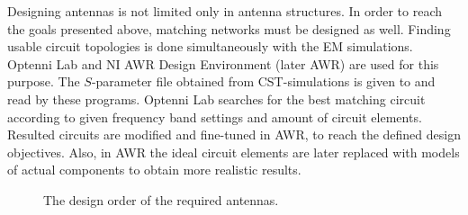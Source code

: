 Designing antennas is not limited only in antenna structures. In order to reach the goals presented above, matching networks must be designed as well. Finding usable circuit topologies is done simultaneously with the EM simulations. Optenni Lab \cite{optenni} and NI AWR Design Environment \cite{awr} (later AWR) are used for this purpose. The $S$-parameter file obtained from CST-simulations is given to and read by these programs. Optenni Lab searches for the best matching circuit according to given frequency band settings and amount of circuit elements. Resulted circuits are modified and fine-tuned in AWR, to reach the defined design objectives. Also, in AWR the ideal circuit elements are later replaced with models of actual components to obtain more realistic results.

\begin{figure}[H]
    \centering
        \caption{The design order of the required antennas.}
        \label{fig:ant_order}
\end{figure} 
    
